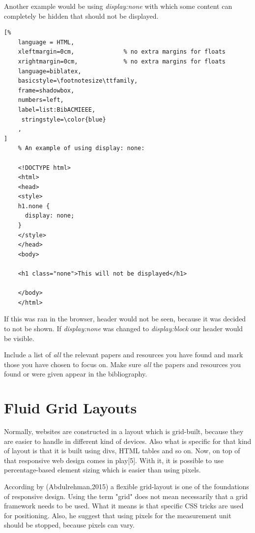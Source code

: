 Another example would be using \emph{display:none} with which some content can completely be hidden that should not be 
displayed.

\begin{lstlisting}[%
    language = HTML, 
    xleftmargin=0cm,              % no extra margins for floats
    xrightmargin=0cm,             % no extra margins for floats
    language=biblatex,
    basicstyle=\footnotesize\ttfamily,
    frame=shadowbox,
    numbers=left,
    label=list:BibACMIEEE,
     stringstyle=\color{blue}
    ,
]
    % An example of using display: none:

    <!DOCTYPE html>
    <html>
    <head>
    <style>
    h1.none {
      display: none;
    }
    </style>
    </head>
    <body>

    <h1 class="none">This will not be displayed</h1>

    </body>
    </html>

\end{lstlisting}




%
If this was ran in the browser, header would not be seen, because
it was decided to not be shown. If \emph{display:none} was changed to \emph{display:block}
our header would be visible.

Include a list of \emph{all} the relevant papers and resources you
have found and mark those you have chosen to focus on. Make sure
\emph{all} the papers and resources you found or were given appear in
the bibliography.




\section{Fluid Grid Layouts}

Normally, websites are constructed in a layout which is grid-built, because they are
easier to handle in different kind of devices. Also what is specific
for that kind of layout is that it is built using divs, HTML tables and so on. Now, on top of that
responsive web design comes in play[5]. With it, it is possible to use percentage-based element sizing which is easier than using pixels. 

According by (Abdulrehman,2015) a flexible grid-layout is one of the foundations of responsive
design. Using the term "grid" does not mean necessarily that a grid framework needs to be used.
What it means is that specific CSS tricks are used for positioning. Also, he suggest that 
using pixels for the measurement unit should be stopped, because pixels can vary. 

